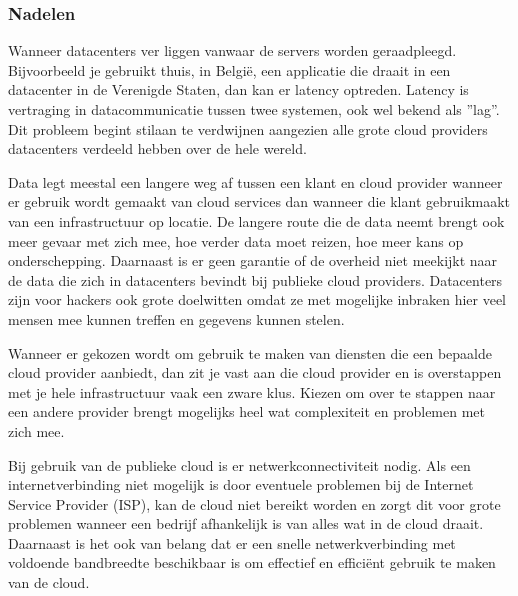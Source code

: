 \subsubsection{Nadelen}
\begin{description}[style=unboxed, labelwidth=\linewidth, listparindent =0pt]
        \item[Latency]
        Wanneer datacenters ver liggen vanwaar de servers worden geraadpleegd. Bijvoorbeeld je gebruikt thuis, in België, een applicatie die draait in een datacenter in de Verenigde Staten, dan kan er latency optreden. Latency is vertraging in datacommunicatie tussen twee systemen, ook wel bekend als ''lag''. Dit probleem begint stilaan te verdwijnen aangezien alle grote cloud providers datacenters verdeeld hebben over de hele wereld.
        \\
        
        \item[Privacy en security]
        Data legt meestal een langere weg af tussen een klant en cloud provider wanneer er gebruik wordt gemaakt van cloud services dan wanneer die klant gebruikmaakt van een infrastructuur op locatie. De langere route die de data neemt brengt ook meer gevaar met zich mee, hoe verder data moet reizen, hoe meer kans op onderschepping. Daarnaast is er geen garantie of de overheid niet meekijkt naar de data die zich in datacenters bevindt bij publieke cloud providers. Datacenters zijn voor hackers ook grote doelwitten omdat ze met mogelijke inbraken hier veel mensen mee kunnen treffen en gegevens kunnen stelen.
        \\
        
        \item [Vendor lock-in]
        Wanneer er gekozen wordt om gebruik te maken van diensten die een bepaalde cloud provider aanbiedt, dan zit je vast aan die cloud provider en is overstappen met je hele infrastructuur vaak een zware klus. Kiezen om over te stappen naar een andere provider brengt mogelijks heel wat complexiteit en problemen met zich mee.
        \\
        
        
        \item [Afhankelijk van netwerkconnectiviteit]
        Bij gebruik van de publieke cloud is er netwerkconnectiviteit nodig. Als een internetverbinding niet mogelijk is door eventuele problemen bij de Internet Service Provider (ISP), kan de cloud niet bereikt worden en zorgt dit voor grote problemen wanneer een bedrijf afhankelijk is van alles wat in de cloud draait. Daarnaast is het ook van belang dat er een snelle netwerkverbinding met voldoende bandbreedte beschikbaar is om effectief en efficiënt gebruik te maken van de cloud.
        \\
        

\end{description}

